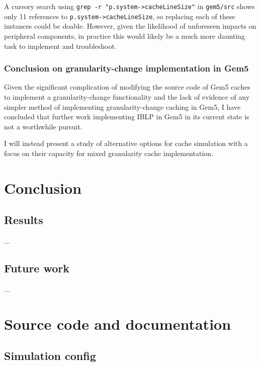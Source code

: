 \documentclass[12pt,twoside]{reedthesis}
\begin{document}
	A cursory search using \verb`grep -r "p.system->cacheLineSize"` in \verb`gem5/src` shows only 11 references to \verb`p.system->cacheLineSize`, so replacing each of these instances could be doable. However, given the likelihood of unforeseen impacts on peripheral components, in practice this would likely be a much more daunting task to implement and troubleshoot.

	\subsection*{Conclusion on granularity-change implementation in Gem5}

	Given the significant complication of modifying the source code of Gem5 caches to implement a granularity-change functionality and the lack of evidence of any simpler method of implementing granularity-change caching in Gem5, I have concluded that further work implementing IBLP in Gem5 in its current state is not a worthwhile pursuit.

	I will instead present a study of alternative options for cache simulation with a focus on their capacity for mixed granularity cache implementation.

\chapter{Conclusion}

\section{Results}

...

\section{Future work}

...

\appendix

\chapter{Source code and documentation}

\section{Simulation config}
\end{document}
